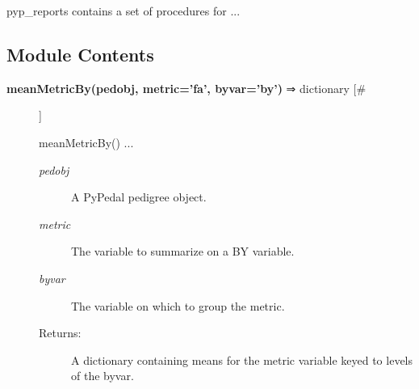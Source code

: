

 pyp\_reports contains a set of procedures for ...
\subsection*{Module Contents}
\begin{description}
\item[\textbf{meanMetricBy(pedobj, metric='fa', byvar='by')}
 ⇒ dictionary [\#]]

 meanMetricBy() ...
\begin{description}
\item[\emph{pedobj}
] A PyPedal pedigree object.
\item[\emph{metric}
] The variable to summarize on a BY variable.
\item[\emph{byvar}
] The variable on which to group the metric.
\item[Returns:] A dictionary containing means for the metric variable keyed to levels of the byvar.

\end{description}
\\ 


\end{description}

